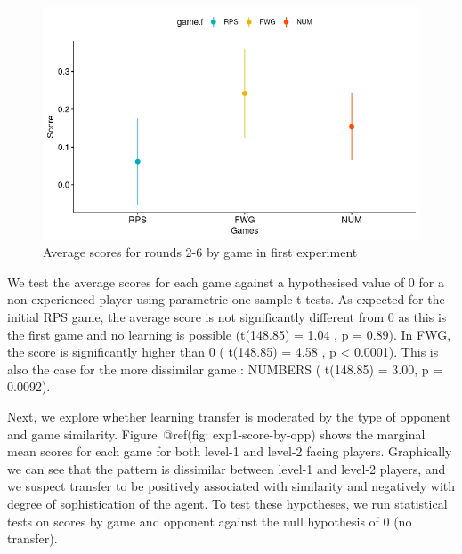 \documentclass[man,floatsintext]{apa6}
\begin{document}
\begin{figure}

{\centering \includegraphics{../Report/images/exp1_early_scor_game} 

}

\caption{Average scores for rounds 2-6 by game in first experiment}\label{fig:exp1-early-score}
\end{figure}

We test the average scores for each game against a hypothesised value of 0 for a non-experienced player using parametric one sample t-tests. As expected for the initial RPS game, the average score is not significantly different from 0 as this is the first game and no learning is possible (t(148.85) = 1.04 , p = 0.89). In FWG, the score is significantly higher than 0 ( t(148.85) = 4.58 , p \textless{} 0.0001). This is also the case for the more dissimilar game : NUMBERS ( t(148.85) = 3.00, p = 0.0092).

Next, we explore whether learning transfer is moderated by the type of opponent and game similarity. Figure~@ref(fig: exp1-score-by-opp) shows the marginal mean scores for each game for both level-1 and level-2 facing players. Graphically we can see that the pattern is dissimilar between level-1 and level-2 players, and we suspect transfer to be positively associated with similarity and negatively with degree of sophistication of the agent. To test these hypotheses, we run statistical tests on scores by game and opponent against the null hypothesis of 0 (no transfer).
\end{document}
